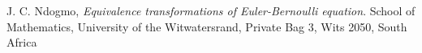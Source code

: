 \begin{thebibliography}{9}

  J. C. Ndogmo,
  \emph{Equivalence transformations of Euler-Bernoulli equation}.
  School of Mathematics, University of the Witwatersrand, Private Bag 3, Wits 2050, South
Africa

\end{thebibliography}